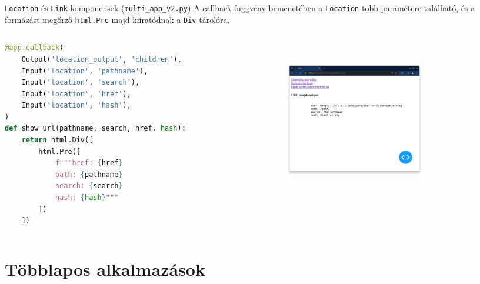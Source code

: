 \documentclass[english, aspectratio=169]{beamer}
\makeatletter
\let\origtableofcontents=\tableofcontents
\def\tableofcontents{\@ifnextchar[{\origtableofcontents}{\gobbletableofcontents}}
\def\gobbletableofcontents#1{\origtableofcontents}
\makeatother
\begin{document}
	\begin{frame}[fragile]{\texttt{Location} és \texttt{Link} komponensek (\texttt{multi\_app\_v2.py})}
		A callback függvény bemenetében a \texttt{Location} több paramétere található, és a formázást megőrző \texttt{html.Pre} majd kiíratódnak a \texttt{Div} tárolóra. 
		\begin{columns}
			\begin{column}{.6\textwidth}
				\begin{lstlisting}[language=python]
@app.callback(
	Output('location_output', 'children'),
	Input('location', 'pathname'),
	Input('location', 'search'),
	Input('location', 'href'),
	Input('location', 'hash'),
)
def show_url(pathname, search, href, hash):
	return html.Div([
		html.Pre([
			f"""href: {href}
			path: {pathname}
			search: {search}
			hash: {hash}"""
		])
	])
				\end{lstlisting}
			\end{column}
			\begin{column}{.4\textwidth}
				\begin{center}
					\includegraphics[width=6cm, height=7cm, keepaspectratio]{images/adv_6.png}
				\end{center}
			\end{column}
		\end{columns}
	\end{frame}
	
	\section{Többlapos alkalmazások}
	
	\begin{frame}{}
		\tableofcontents[currentsection]
	\end{frame}
	
\end{document}
